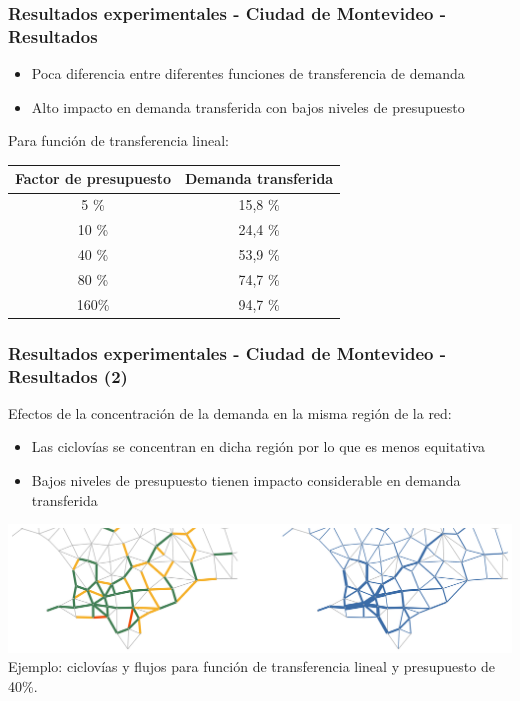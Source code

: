 \documentclass[aspectratio=43, 10pt]{beamer}
\begin{document}
\begin{frame}
    \frametitle{Resultados experimentales - Ciudad de Montevideo - Resultados}

    \begin{itemize}
        \item{Poca diferencia entre diferentes funciones de transferencia de demanda}
        \item{Alto impacto en demanda transferida con bajos niveles de presupuesto}
    \end{itemize}

    Para función de transferencia lineal:
    \begin{center}
        \begin{tabular}{c c}
            \hline
            Factor de presupuesto & Demanda transferida \\
            \hline
            \hline
            5  \% & 15,8 \% \\
            10 \% & 24,4 \% \\
            40 \% & 53,9 \% \\
            80 \% & 74,7 \% \\
            160\% & 94,7 \% \\
            \hline
        \end{tabular}
    \end{center}
\end{frame}

\begin{frame}
    \frametitle{Resultados experimentales - Ciudad de Montevideo - Resultados (2)}

    Efectos de la concentración de la demanda en la misma región de la red:

    \begin{itemize}
        \item{Las ciclovías se concentran en dicha región por lo que es menos equitativa}
        \item{Bajos niveles de presupuesto tienen impacto considerable en demanda transferida}
    \end{itemize}

    \includegraphics[width=\textwidth]{images/mdeo_0.4_results.png}
    \small
    Ejemplo: ciclovías y flujos para función de transferencia lineal y presupuesto de 40\%.
\end{frame}
\end{document}
